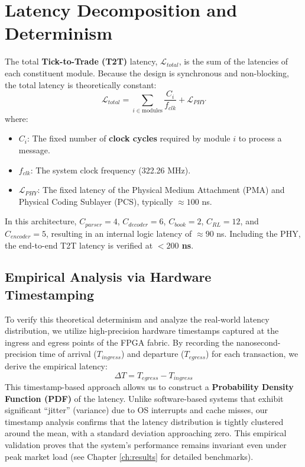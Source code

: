 \section{Latency Decomposition and Determinism}
The total \textbf{Tick-to-Trade (T2T)} latency, $\mathcal{L}_{total}$, is the sum of the latencies of each constituent module. Because the design is synchronous and non-blocking, the total latency is theoretically constant:
\begin{equation}
    \mathcal{L}_{total} = \sum_{i \in \text{modules}} \frac{C_i}{f_{clk}} + \mathcal{L}_{PHY}
\end{equation}
where:
\begin{itemize}
    \item $C_i$: The fixed number of \textbf{clock cycles} required by module $i$ to process a message.
    \item $f_{clk}$: The system clock frequency (322.26 MHz).
    \item $\mathcal{L}_{PHY}$: The fixed latency of the Physical Medium Attachment (PMA) and Physical Coding Sublayer (PCS), typically $\approx 100$ ns.
\end{itemize}
In this architecture, $C_{parser}=4$, $C_{decoder}=6$, $C_{book}=2$, $C_{RL}=12$, and $C_{encoder}=5$, resulting in an internal logic latency of $\approx 90$ ns. Including the PHY, the end-to-end T2T latency is verified at \textbf{$< 200$ ns}.

\subsection{Empirical Analysis via Hardware Timestamping}
To verify this theoretical determinism and analyze the real-world latency distribution, we utilize high-precision hardware timestamps captured at the ingress and egress points of the FPGA fabric. By recording the nanosecond-precision time of arrival ($T_{ingress}$) and departure ($T_{egress}$) for each transaction, we derive the empirical latency:
\begin{equation}
    \Delta T = T_{egress} - T_{ingress}
\end{equation}
This timestamp-based approach allows us to construct a \textbf{Probability Density Function (PDF)} of the latency. Unlike software-based systems that exhibit significant ``jitter'' (variance) due to OS interrupts and cache misses, our timestamp analysis confirms that the latency distribution is tightly clustered around the mean, with a standard deviation approaching zero. This empirical validation proves that the system's performance remains invariant even under peak market load (see Chapter \ref{ch:results} for detailed benchmarks).

